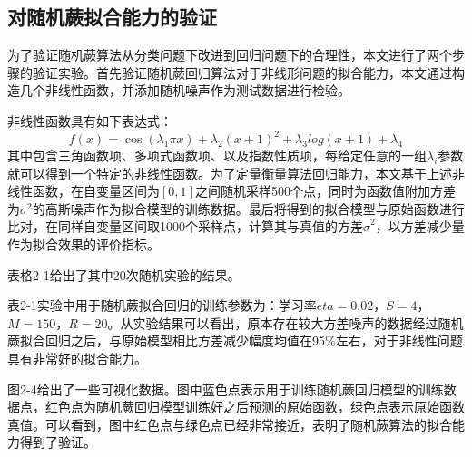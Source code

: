 \subsection{对随机蕨拟合能力的验证} %

为了验证随机蕨算法从分类问题下改进到回归问题下的合理性，本文进行了两个步骤的验证实验。首先验证随机蕨回归算法对于非线形问题的拟合能力，本文通过构造几个非线性函数，并添加随机噪声作为测试数据进行检验。

非线性函数具有如下表达式：
\begin{equation}
	f(x) = \cos(\lambda_1\pi x)+ \lambda_2 (x+1)^2 + \lambda_3 log(x+1) + \lambda_4
\end{equation}
其中包含三角函数项、多项式函数项、以及指数性质项，每给定任意的一组$\lambda_i$参数就可以得到一个特定的非线性函数。为了定量衡量算法回归能力，本文基于上述非线性函数，在自变量区间为$[0,1]$之间随机采样500个点，同时为函数值附加方差为$\sigma^2$的高斯噪声作为拟合模型的训练数据。最后将得到的拟合模型与原始函数进行比对，在同样自变量区间取1000个采样点，计算其与真值的方差$\hat{\sigma}^2$，以方差减少量作为拟合效果的评价指标。

表格2-1给出了其中20次随机实验的结果。

表2-1实验中用于随机蕨拟合回归的训练参数为：学习率$eta=0.02$，$S=4$，$M=150$，$R=20$。从实验结果可以看出，原本存在较大方差噪声的数据经过随机蕨拟合回归之后，与原始模型相比方差减少幅度均值在95\%左右，对于非线性问题具有非常好的拟合能力。

图2-4给出了一些可视化数据。图中蓝色点表示用于训练随机蕨回归模型的训练数据点，红色点为随机蕨回归模型训练好之后预测的原始函数，绿色点表示原始函数真值。可以看到，图中红色点与绿色点已经非常接近，表明了随机蕨算法的拟合能力得到了验证。

